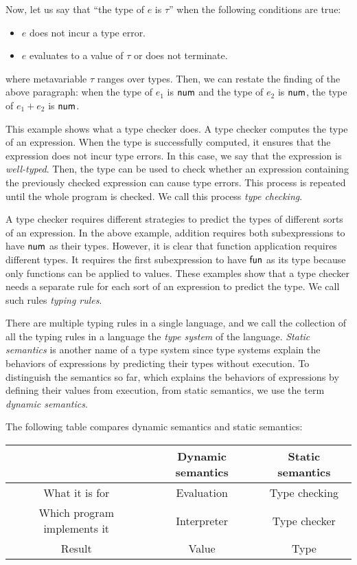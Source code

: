 Now, let us say that ``the type of $e$ is $\tau$'' when the following conditions
are true:
\begin{itemize}
  \item $e$ does not incur a type error.
  \item $e$ evaluates to a value of $\tau$ or does not terminate.
\end{itemize}
where metavariable $\tau$ ranges over types. Then, we can restate the finding of
the above paragraph: when the type of $e_1$ is $\textsf{num}$ and the type of $e_2$ is
$\textsf{num}$, the type of $e_1+e_2$ is $\textsf{num}$.

This example shows what a type checker does. A type checker computes the type of
an expression. When the type is successfully computed, it ensures that the
expression does not incur type errors. In this case, we say that the expression
is \textit{well-typed}.
Then, the type can be used to check
whether an expression containing the previously checked expression can cause
type errors. This process is repeated until the whole program is checked. We
call this process \textit{type checking}.

A type checker requires different strategies to predict the types of different
sorts of an expression. In the above example, addition requires both
subexpressions to have $\textsf{num}$ as their types. However, it is clear that function
application requires different types. It requires the first subexpression to
have $\textsf{fun}$ as its type because only functions can be applied to values. These
examples show that a type checker needs a separate rule for each sort of an
expression to predict the type. We call such rules
\textit{typing rules}.

There are multiple typing rules in a
single language, and we call the collection of all the typing rules in a language the
\textit{type system} of the language.
\textit{Static semantics} is another name of a type system since type systems explain the
behaviors of expressions by predicting their types without execution. To
distinguish the semantics so far, which explains the behaviors of expressions by
defining their values from execution, from static semantics, we use the term
\textit{dynamic semantics}.

The following table compares dynamic semantics and static semantics:

\begin{tabular}{@{~}c@{~}||@{~}c@{~}|@{~}c@{~}}
  & Dynamic semantics & Static semantics \\ \hline
  What it is for & Evaluation & Type checking \\
  Which program implements it & Interpreter & Type checker \\
  Result & Value & Type \\
\end{tabular}

